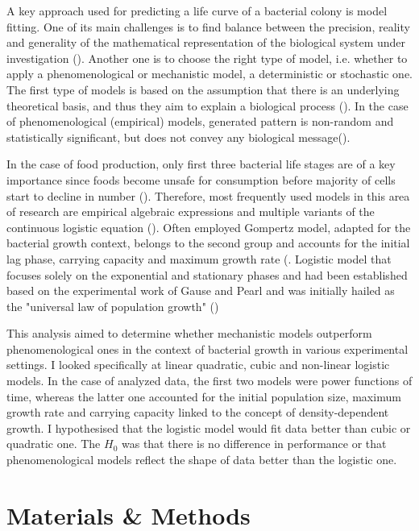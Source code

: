\documentclass[a4paper,11pt]{article}
\begin{document}
A key approach used for predicting a life curve of a bacterial colony is model fitting. One of its main challenges is to find balance between the precision, reality and generality of the mathematical representation of the biological system under investigation (\cite{levins1966strategy}). Another one is to choose the right type of model, i.e. whether to apply a phenomenological or mechanistic model, a deterministic or stochastic one. The first type of models is based on the assumption that there is an underlying theoretical basis, and thus they aim to explain a biological process (\cite{peleg2011microbial}). In the case of phenomenological (empirical) models, generated pattern is non-random and statistically significant, but does not convey any biological message(\cite{peleg2011microbial}).\par

In the case of food production, only first three bacterial life stages are of a key importance since foods become unsafe for consumption before majority of cells start to decline in number (\cite{peleg2011microbial}). Therefore, most frequently used models in this area of research are empirical algebraic expressions and multiple variants of the continuous logistic equation (\cite{peleg2011microbial}). Often employed Gompertz model, adapted for the bacterial growth context, belongs to the second group and accounts for the initial lag phase, carrying capacity and maximum growth rate (\cite{buchanan1997simple}. Logistic model that focuses solely on the exponential and stationary phases and had been established based on the experimental work of Gause and Pearl and was initially hailed as the "universal law of population growth" (\cite{krebs1985ecology})\par

This analysis aimed to determine whether mechanistic models outperform phenomenological ones in the context of bacterial growth in various experimental settings. I looked specifically at linear quadratic, cubic and non-linear logistic models. In the case of analyzed data, the first two models were power functions of time, whereas the latter one accounted for the initial population size, maximum growth rate and carrying capacity linked to the concept of density-dependent growth. I hypothesised that the logistic model would fit data better than cubic or quadratic one. The $H_{0}$ was that there is no difference in performance or that phenomenological models reflect the shape of data better than the logistic one.

    \section{Materials \& Methods}
    
\end{document}
